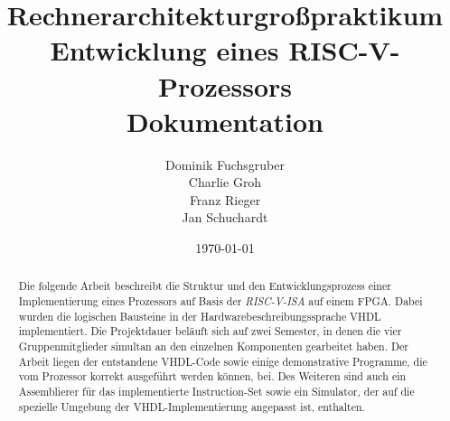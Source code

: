 \documentclass{report}
\title{\large \textbf{Rechnerarchitekturgro\ss{}praktikum} \\[10pt] Entwicklung eines RISC-V-Prozessors \\[10pt] \Huge Dokumentation}
\author{Dominik Fuchsgruber \\ Charlie Groh \\ Franz Rieger \\ Jan Schuchardt}
\date{\today}
\begin{document}
\maketitle
\begin{abstract}
Die folgende Arbeit beschreibt die Struktur und den Entwicklungsprozess einer
Implementierung eines Prozessors auf Basis der \textit{RISC-V-ISA} auf einem FPGA. Dabei wurden die logischen
Bausteine in der Hardwarebeschreibungssprache VHDL implementiert. Die
Projektdauer bel\"auft sich auf zwei Semester, in denen die vier
Gruppenmitglieder simultan an den einzelnen Komponenten gearbeitet haben. Der
Arbeit liegen der entstandene VHDL-Code sowie einige
demonstrative Programme, die vom Prozessor korrekt ausgef\"uhrt werden
k\"onnen, bei. Des Weiteren sind auch ein Assemblierer f\"ur das implementierte
Instruction-Set sowie ein Simulator, der auf die spezielle Umgebung der
VHDL-Implementierung angepasst ist, enthalten.
\end{abstract}
\begingroup
\let\clearpage\relax
\let\textbf\relax
\tableofcontents
\listoftables
\listoffigures
\endgroup
\clearpage{}








\appendix{}

\clearpage{}

\clearpage{}

\clearpage{}
\end{document}
